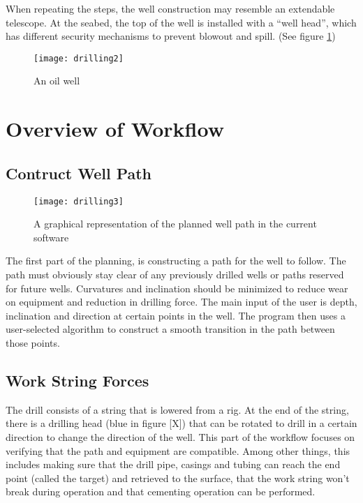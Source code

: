 \documentclass{report}
\begin{document}
When repeating the steps, the well construction may resemble an extendable telescope. At the seabed, the top of the well is installed with a “well head”, which has different security mechanisms to prevent blowout and spill. (See figure \ref{fig:oil_well})

\begin{figure}
    \centering
    \texttt{[image: drilling2]}
    \caption{An oil well \label{fig:oil_well}}
\end{figure}

\section{Overview of Workflow} \label{sec:overview_of_workflow}

\subsection{Contruct Well Path}
\begin{wrapfigure}{R}{0.3\textwidth}
    \centering
    \texttt{[image: drilling3]}
    \caption{A graphical representation of the planned well path in the current software \label{fig:graphical_representation_of_planned_well_path}}
\end{wrapfigure}

The first part of the planning, is constructing a path for the well to follow. The path must obviously stay clear of any previously drilled wells or paths reserved for future wells. Curvatures and inclination should be minimized to reduce wear on equipment and reduction in drilling force. The main input of the user is depth, inclination and direction at certain points in the well. The program then uses a user-selected algorithm to construct a smooth transition in the path between those points.

\subsection{Work String Forces}
The drill consists of a string that is lowered from a rig. At the end of the string, there is a drilling head (blue in figure [X]) that can be rotated to drill in a certain direction to change the direction of the well. This part of the workflow focuses on verifying that the path and equipment are compatible. Among other things, this includes making sure that the drill pipe, casings and tubing can reach the end point (called the target) and retrieved to the surface, that the work string won’t break during operation and that cementing operation can be performed.
\end{document}
